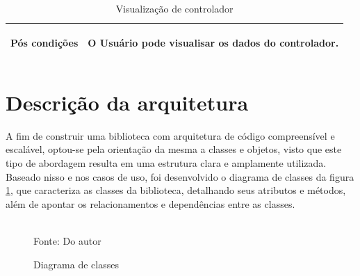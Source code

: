 \begin{table}[H]
\begin{center}
\begin{tabularx}{\textwidth}{|>{\bfseries\raggedright\arraybackslash\center}m{5cm}|X|}
            Pós condições                                   & O Usuário pode visualisar os dados do controlador.                                                                                                                                                                                                                                       \\ \hline
        \end{tabularx}
        \caption{Visualização de controlador}
        \label{tab:uc5}
    \end{center}
\end{table}




\section{Descrição da arquitetura}\label{sec:descarc}

A fim de construir uma biblioteca com arquitetura de código compreensível e escalável, optou-se pela orientação
da mesma a classes e objetos, visto que este tipo de abordagem resulta em uma estrutura clara e amplamente utilizada.
Baseado nisso e nos casos de uso, foi desenvolvido o diagrama de classes da figura \ref{fig:class_diag}, que caracteriza
as classes da biblioteca, detalhando seus atributos e métodos, além de apontar os relacionamentos e dependências entre
as classes.

\begin{figure}[H]
    \centering
    \caption{Diagrama de classes}
    \label{fig:class_diag}
    \\
    \vspace{0cm}\hspace{0cm}\small{Fonte: Do autor}
\end{figure}

